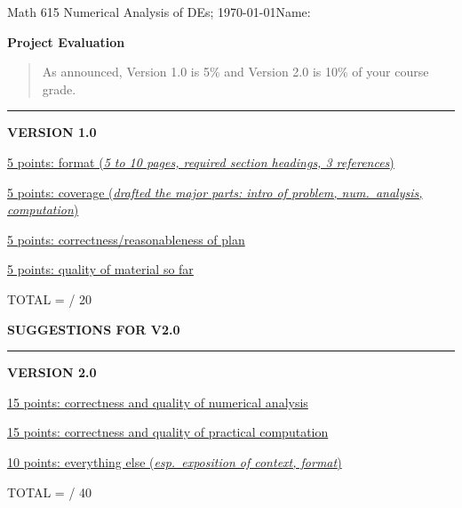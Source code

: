 \documentclass[11pt]{amsart}
\newcommand{\normalspacing}{\renewcommand{\baselinestretch}{1.05}
        \tiny\normalsize}
\begin{document}
\scriptsize \phantom{bob} \vspace{-0.3in}
\noindent Math 615 Numerical Analysis of DEs; \today \hfill \Large Name:\underline{\phantom{DLFJD SFLKJSD sdfa}}

\thispagestyle{empty}
\bigskip

\Large\centerline{\textbf{Project Evaluation}}
\normalsize\normalspacing

\bigskip

\begin{quote}
As announced, Version 1.0 is 5\% and Version 2.0 is 10\% of your course grade.
\end{quote}

\vspace{0.3in}

\noindent\rule{\textwidth}{0.7mm}
\bigskip

\large\centerline{\textbf{VERSION 1.0}}
\bigskip

\noindent \underline{5 points: format (\emph{5 to 10 pages, required section headings, 3 references})}
\vfill

\noindent \underline{5 points: coverage (\emph{drafted the major parts: intro of problem, num.~analysis, computation})}
\vfill

\noindent \underline{5 points: correctness/reasonableness of plan}
\vfill

\noindent \underline{5 points: quality of material so far}
\vfill

\hfill TOTAL = \phantom{foo bar} / 20

\newpage


\large\centerline{\textbf{SUGGESTIONS FOR V2.0}}
\bigskip

\vspace{3.0in}

\noindent\rule{\textwidth}{0.7mm}
\bigskip

\large\centerline{\textbf{VERSION 2.0}}
\bigskip

\noindent \underline{15 points: correctness and quality of numerical analysis}
\vfill

\noindent \underline{15 points: correctness and quality of practical computation}
\vfill

\noindent \underline{10 points: everything else (\emph{esp.~exposition of context, format})}
\vfill

\hfill TOTAL = \phantom{foo bar} / 40
\end{document}
